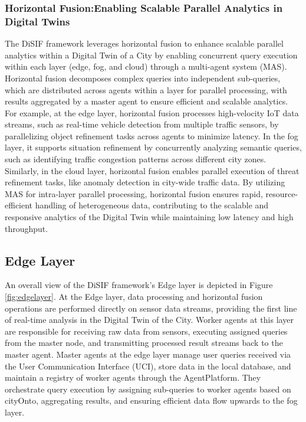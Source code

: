 \documentclass[5p,times]{elsarticle}
\begin{document}
\subsubsection{Horizontal Fusion:Enabling Scalable Parallel Analytics in Digital Twins}

The DiSIF framework leverages horizontal fusion to enhance scalable 
parallel analytics within a Digital Twin of a City by enabling concurrent
 query execution within each layer (edge, fog, and cloud) through a multi-agent system (MAS).
  Horizontal fusion decomposes complex queries into independent sub-queries,
   which are distributed across agents within a layer for parallel processing, 
   with results aggregated by a master agent to ensure efficient and scalable analytics.
    For example, at the edge layer, horizontal fusion processes high-velocity
    IoT data streams, such as real-time vehicle detection from multiple traffic sensors,
     by parallelizing object refinement tasks across agents to minimize latency.
      In the fog layer, it supports situation refinement by concurrently analyzing semantic
       queries, such as identifying traffic congestion patterns across different city zones.
        Similarly, in the cloud layer, horizontal fusion enables parallel execution
         of threat refinement tasks, like anomaly detection in city-wide traffic data.
          By utilizing MAS for intra-layer parallel processing, horizontal
           fusion ensures rapid, resource-efficient handling of heterogeneous data, 
           contributing to the scalable and responsive analytics of the Digital Twin
            while maintaining low latency and high throughput.








\subsection{Edge Layer}

An overall view of the DiSIF framework’s Edge layer is
depicted in Figure \ref{fig:edgelayer}.
At the Edge layer, data processing and horizontal fusion operations are
performed directly on sensor data streams, providing the first
line of real-time analysis in the Digital Twin of the City. Worker
agents at this layer are responsible for receiving raw data from
sensors, executing assigned queries from the master node, and
transmitting processed result streams back to the master agent.
Master agents at the edge layer manage user queries received via
the User Communication Interface (UCI), store data in the local
database, and maintain a registry of worker agents through the
AgentPlatform. They orchestrate query execution by assigning
sub-queries to worker agents based on cityOnto, aggregating results, and ensuring
efficient data flow upwards to the fog layer.
\end{document}

